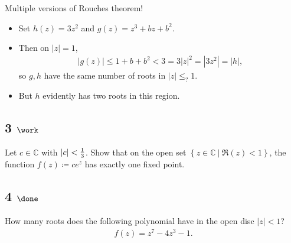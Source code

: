 \begin{solution}

\hfill

\begin{concept}

\hfill

Multiple versions of Rouches theorem!

\end{concept}

\begin{itemize}
\item
  Set \(h(z) = 3z^2\) and \(g(z) = z^3 + bz + b^2\).
\item
  Then on \({\left\lvert {z} \right\rvert} = 1\),
  \begin{align*}     {\left\lvert {g(z)} \right\rvert} \leq 1 + b + b^2 < 3 = 3{\left\lvert {z} \right\rvert}^2 = {\left\lvert {3z^2} \right\rvert} = {\left\lvert {h} \right\rvert}     ,\end{align*}
  so \(g, h\) have the same number of roots in
  \({\left\lvert {z} \right\rvert} \leq_? 1\).
\item
  But \(h\) evidently has two roots in this region.
\end{itemize}

\end{solution}

\hypertarget{work-61}{%
\subsection{\texorpdfstring{3
\(\work\)}{3 \textbackslash work}}\label{work-61}}

Let \(c\in {\mathbb{C}}\) with
\({\left\lvert {c} \right\rvert} < {1\over 3}\). Show that on the open
set \(\left\{{z\in {\mathbb{C}}{~\mathrel{\Big|}~}\Re(z) < 1}\right\}\),
the function \(f(z) \coloneqq ce^z\) has exactly one fixed point.

\hypertarget{done-10}{%
\subsection{\texorpdfstring{4
\(\done\)}{4 \textbackslash done}}\label{done-10}}

How many roots does the following polynomial have in the open disc
\({\left\lvert {z} \right\rvert} < 1\)?
\begin{align*}
f(z) = z^7 - 4z^3 - 1
.\end{align*}

